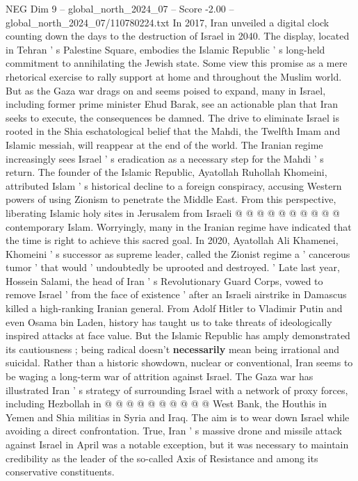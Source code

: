 \begin{textsample}{NEG Dim 9 – global\_north\_2024\_07 – Score -2.00 – global\_north\_2024\_07/110780224.txt}  \label{ex:f9_neg_143}
In 2017, Iran unveiled a digital clock counting down the days to the destruction of Israel in 2040.
The display, located in Tehran ' s Palestine Square, embodies the Islamic Republic ' s long-held commitment to annihilating the Jewish state.
Some view this promise as a mere rhetorical exercise to rally support at home and throughout the Muslim world.
But as the Gaza war drags on and seems poised to expand, many in Israel, including former prime minister Ehud Barak, see an actionable plan that Iran seeks to execute, the consequences be damned.
The drive to eliminate Israel is rooted in the Shia eschatological belief that the Mahdi, the Twelfth Imam and Islamic messiah, will reappear at the end of the world.
The Iranian regime increasingly sees Israel ' s eradication as a necessary step for the Mahdi ' s return.
The founder of the Islamic Republic, Ayatollah Ruhollah Khomeini, attributed Islam ' s historical decline to a foreign conspiracy, accusing Western powers of using Zionism to penetrate the Middle East.
From this perspective, liberating Islamic holy sites in Jerusalem from Israeli @ @ @ @ @ @ @ @ @ @ contemporary Islam.
Worryingly, many in the Iranian regime have indicated that the time is right to achieve this sacred goal.
In 2020, Ayatollah Ali Khamenei, Khomeini ' s successor as supreme leader, called the Zionist regime a ' cancerous tumor ' that would ' undoubtedly be uprooted and destroyed. ' Late last year, Hossein Salami, the head of Iran ' s Revolutionary Guard Corps, vowed to remove Israel ' from the face of existence ' after an Israeli airstrike in Damascus killed a high-ranking Iranian general.
From Adolf Hitler to Vladimir Putin and even Osama bin Laden, history has taught us to take threats of ideologically inspired attacks at face value.
But the Islamic Republic has amply demonstrated its cautiousness ; being radical doesn't \textbf{necessarily} mean being irrational and suicidal.
Rather than a historic showdown, nuclear or conventional, Iran seems to be waging a long-term war of attrition against Israel.
The Gaza war has illustrated Iran ' s strategy of surrounding Israel with a network of proxy forces, including Hezbollah in @ @ @ @ @ @ @ @ @ @ West Bank, the Houthis in Yemen and Shia militias in Syria and Iraq.
The aim is to wear down Israel while avoiding a direct confrontation.
True, Iran ' s massive drone and missile attack against Israel in April was a notable exception, but it was necessary to maintain credibility as the leader of the so-called Axis of Resistance and among its conservative constituents.

\end{textsample}
